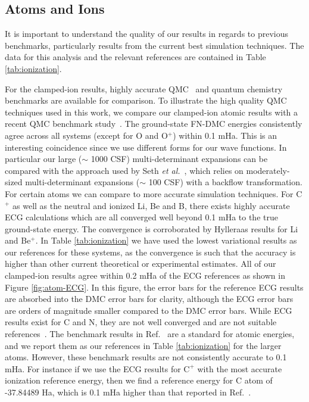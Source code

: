 \documentclass[pra,superscriptaddress,groupedaddress,twocolumn]{revtex4}
\begin{document}
\subsection{Atoms and Ions}

It is important to understand the quality of our results in regards to previous benchmarks, particularly results from the current best simulation techniques. The data for this analysis and the relevant references are contained in Table \ref{tab:ionization}. 

For the clamped-ion results, highly accurate QMC~\cite{Brown_Bench,Toulouse_Bench,Seth_Bench,Morale_Bench,Rappe_Bench} and quantum chemistry benchmarks are available for comparison. To illustrate the high quality QMC techniques used in this work, we compare our clamped-ion atomic results with a recent QMC benchmark study~\cite{Seth_Bench}. The ground-state FN-DMC energies consistently agree across all systems (except for O and O$^{+}$) within 0.1 mHa. This is an interesting coincidence since we use different forms for our wave functions. In particular our large ($\sim$ 1000 CSF) multi-determinant expansions can be compared with the approach used by Seth {\it et al.}~\cite{Seth_Bench}, which relies on moderately-sized multi-determinant expansions ($\sim$ 100 CSF) with a backflow transformation. For certain atoms we can compare to more accurate simulation techniques. For C$^+$ as well as the neutral and ionized Li, Be and B, there exists highly accurate ECG calculations which are all converged well beyond 0.1 mHa to the true ground-state energy. The convergence is corroborated by Hylleraas results for Li and Be$^+$. In Table \ref{tab:ionization} we have used the lowest variational results as our references for these systems, as the convergence is such that the accuracy is higher than other current theoretical or experimental estimates. All of our clamped-ion results agree within 0.2 mHa of the ECG references as shown in Figure \ref{fig:atom-ECG}. In this figure, the error bars for the reference ECG results are absorbed into the DMC error bars for clarity, although the ECG error bars are orders of magnitude smaller compared to the DMC error bars. While ECG results exist for C and N, they are not well converged and are not suitable references~\cite{Bubin_C,Sharkey_N}. The benchmark results in Ref.~\cite{Davidson_Atoms} are a standard for atomic energies, and we report them as our references in Table \ref{tab:ionization} for the larger atoms. However, these benchmark results are not consistently accurate to 0.1 mHa. For instance if we use the ECG results for $\text{C}^+$ with the most accurate ionization reference energy, then we find a reference energy for C atom of -37.84489 Ha, which is 0.1 mHa higher than that reported in Ref.~\cite{Davidson_Atoms}. %
\end{document}
